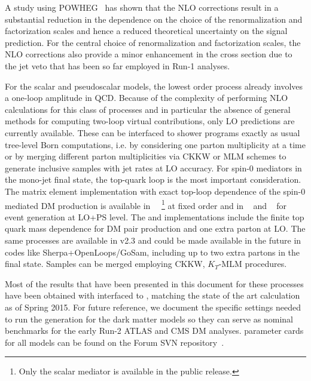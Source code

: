 A study using POWHEG~\cite{Haisch:2013ata,Fox:2012ru} has shown that the NLO corrections result in a substantial reduction in the dependence on the choice of the renormalization and factorization scales and hence a reduced theoretical uncertainty on the signal prediction. For the central choice of renormalization and factorization scales, the NLO corrections also provide a minor enhancement in the cross section due to the jet veto that has been so far employed in Run-1 analyses.

For the scalar and pseudoscalar models, the lowest order process
already involves a one-loop amplitude in QCD.
Because of the complexity of performing NLO calculations for this class of processes and in particular the absence of general methods for computing two-loop virtual contributions, only LO predictions are currently available. These can be interfaced to shower programs exactly as usual tree-level Born computations, i.e. by considering one parton multiplicity at a time
or by merging different parton multiplicities via CKKW or MLM schemes to generate inclusive samples with jet rates at LO accuracy.  For spin-0 mediators in the mono-jet final state,
the top-quark loop is the most important consideration.
The matrix element implementation with exact top-loop dependence of the \schannel spin-0 mediated DM production is available in \mcfm~\cite{Fox:2012ru,Harris:2014hga}~\footnote{Only the scalar mediator is available in the public release.} at fixed order and in \powheg~\cite{Haisch:2015ioa} and \madgraph~\cite{NewMadgraphModels} for event generation at LO+PS level. The \powheg and \mcfm implementations include the finite
top quark mass dependence for DM pair production and one extra parton at LO. 
The same processes are available in \madgraph v2.3 and could be made
available in the future in codes like {\sc Sherpa+OpenLoops/GoSam}, including up to two extra partons in the final state. Samples can be merged employing CKKW, $K_T$-MLM procedures.

Most of the results that have been presented in this document for these processes have been obtained with \powheg interfaced to \pythiaEight, matching the state of the art calculation as of Spring 2015. For future reference, we document the specific settings needed to run the \powheg generation for the dark matter models so they can serve as nominal benchmarks for the early Run-2 ATLAS and CMS DM analyses. \powheg parameter cards for all models can be found on the Forum SVN repository~\cite{ForumSVN_DMA, ForumSVN_DMV, ForumSVN_DMS_tloop, ForumSVN_DMP_tloop}.

